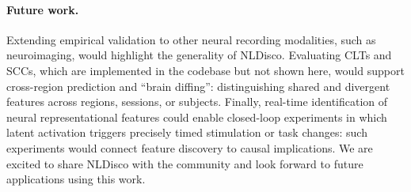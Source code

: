 \paragraph{Future work.}
Extending empirical validation to other neural recording modalities, such as neuroimaging, would highlight the generality of NLDisco. Evaluating CLTs and SCCs, which are implemented in the codebase but not shown here, would support cross-region prediction and ``brain diffing'': distinguishing shared and divergent features across regions, sessions, or subjects. Finally, real-time identification of neural representational features could enable closed-loop experiments in which latent activation triggers precisely timed stimulation or task changes: such experiments would connect feature discovery to causal implications. We are excited to share NLDisco with the community and look forward to future applications using this work.
